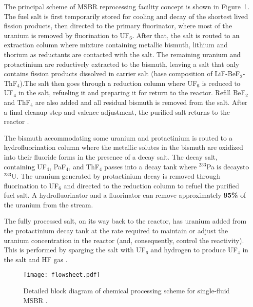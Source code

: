 The principal scheme of \gls{MSBR} reprocessing facility concept is shown in Figure~\ref{fig:material_flow}. The fuel salt is first temporarily stored for cooling and decay of the shortest lived fission products, then directed to the primary fluorinator, where most of the uranium is removed by fluorination to UF$_6$. After that, the salt is routed to an extraction column where mixture containing metallic bismuth, lithium and thorium as reductants are contacted with the salt. The remaining uranium and protactinium are reductively extracted to the bismuth, leaving a salt that only contains fission products dissolved in carrier salt (base composition of LiF-BeF$_2$-ThF$_4$).The salt then goes through a reduction column where UF$_6$ is reduced to UF$_4$ in the salt, refueling it and preparing it for return to the reactor. Refill BeF$_2$ and ThF$_4$ are also added and all residual bismuth is removed from the salt. After a final cleanup step and valence adjustment, the purified salt returns to the reactor \cite{carter_design_1972,sorensen_one-fluid_2006}.

The bismuth accommodating some uranium and protactinium is routed to a hydrofluorination column where the metallic solutes in the bismuth are oxidized into their fluoride forms in the presence of a decay salt. The decay salt, containing UF$_4$, PaF$_4$, and ThF$_4$ passes into a decay tank where $^{233}$Pa is decaysto $^{233}$U. The uranium generated by protactinium decay is removed through fluorination to UF$_6$ and directed to the reduction column to refuel the purified fuel salt. A hydrofluorinator and a fluorinator can remove approximately \textbf{95\%} of the uranium from the stream.

The fully processed salt, on its way back to the reactor, has uranium added from the protactinium decay tank at the rate required to maintain or adjust the uranium concentration in the reactor (and, consequently, control the reactivity). This is performed by sparging the salt with UF$_6$ and hydrogen to produce UF$_4$ in the salt and HF gas \cite{robertson_conceptual_1971}.

\begin{figure}[htp!] %
  \centering
  \vspace{-0.3em}
  \texttt{[image: flowsheet.pdf]}
  \caption{Detailed block diagram of chemical processing scheme for single-fluid \gls{MSBR} \cite{robertson_conceptual_1971, sorensen_one-fluid_2006}.}
  \vspace{-0.6em}
  \label{fig:material_flow}
\end{figure}
\FloatBarrier

